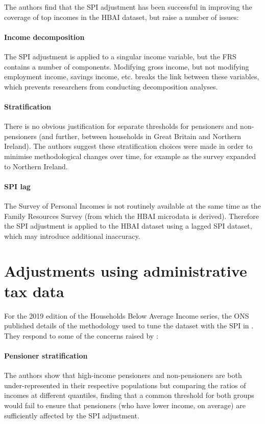 \documentclass{article}
\begin{document}
The authors find that the SPI adjustment has been successful in improving the coverage of top incomes in the HBAI dataset, but raise a number of issues:

\paragraph{Income decomposition} The SPI adjustment is applied to a singular income variable, but the FRS contains a number of components. Modifying gross income, but not modifying employment income, savings income, etc. breaks the link between these variables, which prevents researchers from conducting decomposition analyses.
\paragraph{Stratification} There is no obvious justification for separate thresholds for pensioners and non-pensioners (and further, between households in Great Britain and Northern Ireland). The authors suggest these stratification choices were made in order to minimise methodological changes over time, for example as the survey expanded to Northern Ireland.
\paragraph{SPI lag} The Survey of Personal Incomes is not routinely available at the same time as the Family Resources Survey (from which the HBAI microdata is derived). Therefore the SPI adjustment is applied to the HBAI dataset using a lagged SPI dataset, which may introduce additional inaccuracy.

\section{Adjustments using administrative tax data}

For the 2019 edition of the Households Below Average Income series, the ONS published details of the methodology used to tune the dataset with the SPI in \cite{ons_spi_version_2}. They respond to some of the concerns raised by \cite{ifs_survey_under_coverage}:

\paragraph{Pensioner stratification} The authors show that high-income pensioners and non-pensioners are both under-represented in their respective populations but comparing the ratios of incomes at different quantiles, finding that a common threshold for both groups would fail to ensure that pensioners (who have lower income, on average) are sufficiently affected by the SPI adjustment.
\end{document}
